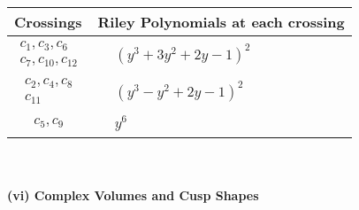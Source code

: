 \documentclass[1p]{elsarticle_modified}
\theoremstyle{definition}
\begin{document}
\begin{tabular}{m{50pt}|m{274pt}}
Crossings & \hspace{64pt}Riley Polynomials at each crossing \\
\hline $$\begin{aligned}c_{1},c_{3},c_{6}\\c_{7},c_{10},c_{12}\end{aligned}$$&$\begin{aligned}
&(y^3+3 y^2+2 y-1)^2
\end{aligned}$\\
\hline $$\begin{aligned}c_{2},c_{4},c_{8}\\c_{11}\end{aligned}$$&$\begin{aligned}
&(y^3- y^2+2 y-1)^2
\end{aligned}$\\
\hline $$\begin{aligned}c_{5},c_{9}\end{aligned}$$&$\begin{aligned}
&y^6
\end{aligned}$\\
\hline
\end{tabular}\\~\\
\newpage\flushleft \textbf{(vi) Complex Volumes and Cusp Shapes}
\end{document}
